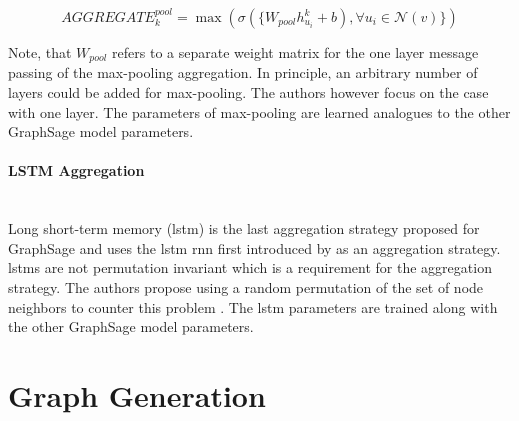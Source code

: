 	\begin{equation}
		AGGREGATE_{k}^{pool} = \max\left(\sigma(\{W_{pool}h_{u_{i}}^{k} +
		b),\forall u_{i} \in \mathcal{N}(v)\}\right)
	\end{equation}

	\noindent Note, that $W_{pool}$ refers to a separate weight matrix for the
	one layer message passing of the max-pooling aggregation. In principle, an 
	arbitrary number of layers could be added for max-pooling. The authors 
	\cite{hamilton2017inductive} however focus on the case with one layer. The
	parameters of max-pooling are learned analogues to the other GraphSage
	model parameters. \\ 

	\paragraph{LSTM Aggregation} \mbox{}\\
	\noindent Long short-term memory (\acs{lstm}) is the last aggregation strategy 
	proposed for GraphSage and uses the \acs{lstm} \acs{rnn} first introduced by
	\cite{hochreiter1997long} as an aggregation strategy. \acsp{lstm} are not
	permutation invariant which is a requirement for the aggregation strategy.
	The authors propose using a random permutation of the set of node neighbors 
	to counter this problem \citep[p. 5]{hamilton2017inductive}. The \acs{lstm}
	parameters are trained along with the other GraphSage model parameters.  

	\section{Graph Generation}
	\label{section:theory_graphgen} 


